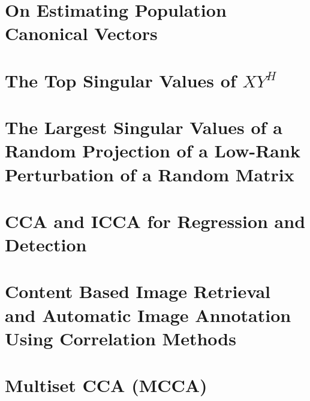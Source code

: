 \documentclass[reqno,12pt,oneside]{report} %
\begin{document}
\chapter{On Estimating Population Canonical Vectors}\label{sec:chpt_cca_vects}


\chapter{The Top Singular Values of $XY^H$}\label{sec:chpt_rcca}


\chapter{The Largest Singular Values of a Random Projection of a Low-Rank Perturbation of
  a Random Matrix}\label{sec:chpt_svd_proj}


\chapter{CCA and ICCA for Regression and Detection}\label{sec:chpt_det_reg}
%


%

%


%

\chapter{Content Based Image Retrieval and Automatic Image Annotation Using Correlation Methods}\label{sec:chpt_ia}


\chapter{Multiset CCA (MCCA)}\label{sec:chpt_mcca}

\end{document}
